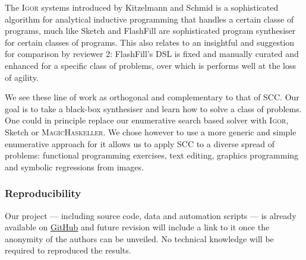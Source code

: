 \documentclass{article}
\begin{document}
The \textsc{Igor} systems introduced by Kitzelmann and Schmid is a sophisticated
algorithm for analytical inductive programming that handles a certain classe of
programs, much like {Sketch} and {FlashFill} are sophisticated program
synthesiser for certain classes of programs. This also relates to an insightful
and suggestion for comparison by reviewer 2: FlashFill's DSL is fixed and
manually curated and enhanced for a specific class of problems, over which is
performs well at the loss of agility.

We see these line of work as orthogonal and complementary to that of SCC\@. Our
goal is to take a black-box synthesiser and learn how to solve a class of
problems. One could in principle replace our enumerative search based solver
with \textsc{Igor}, Sketch or \textsc{MagicHaskeller}. We chose however to
use a more generic and simple enumerative approach for it allows us to apply SCC
to a diverse spread of problems: functional programming exercises, text editing,
graphics programming and symbolic regressions from images.


\subsubsection*{Reproducibility}

Our project --- including source code, data and automation scripts --- is
already available on \url{GitHub} and future revision will include a link to it
once the anonymity of the authors can be unveiled. No technical knowledge will
be required to reproduced the results.
\end{document}
